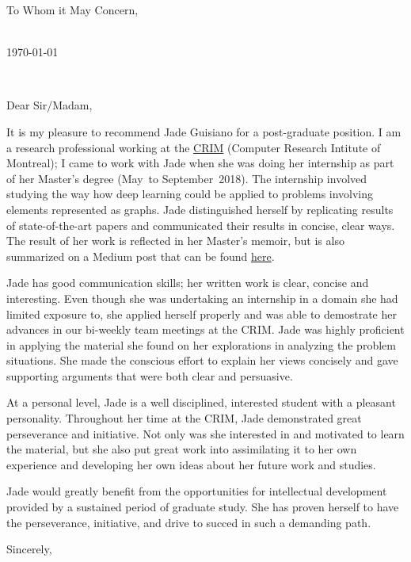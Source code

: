 \documentclass[11pt,a4paper]{letter} %
\def\opening#1{\thispagestyle{empty}
{\centering\fromaddress \vspace{0.6in} \\ %
\hspace*{\longindentation}\today\hspace*{\fill}\par} %
{\raggedright \toname \\ \toaddress \par} %
\vspace{0.4in} %
\noindent #1 %
}
\begin{document}

\begin{letter}
{To Whom it May Concern,
}


\opening{Dear Sir/Madam,}

It is my pleasure to recommend Jade Guisiano for a post-graduate position. I am a research professional working at the \href{http://crim.ca}{CRIM} (Computer Research Intitute of Montreal); I came to work with Jade when she was doing her internship as part of her Master's degree (May~to September~2018). The internship involved studying the way how deep learning could be applied to problems involving elements represented as graphs. Jade distinguished herself by replicating results of state-of-the-art papers and communicated their results in concise, clear ways. The result of her work is reflected in her Master's memoir, but is also summarized on a Medium post that can be found \href{https://medium.com/@jade.guisiano}{here}.


Jade has good communication skills; her written work is clear, concise and interesting. Even though she was undertaking an internship in a domain she had limited exposure to, she applied herself properly and was able to demostrate her advances in our bi-weekly team meetings at the CRIM. Jade was highly proficient in applying the material she found on her explorations in analyzing the problem
situations. She made the conscious effort to explain her views concisely and gave supporting arguments that were both
clear and persuasive. 


At a personal level, Jade is a well disciplined, interested student with a pleasant personality. Throughout her time at the CRIM, Jade demonstrated great
perseverance and initiative. Not only was she interested in and motivated to learn the material, but she also
put great work into assimilating it to her own experience and developing her own ideas about her future work and studies.

Jade would greatly benefit from the opportunities for intellectual development provided by
a sustained period of graduate study. She has proven herself to have the perseverance, initiative, and drive to succed in such a demanding path.


\closing{Sincerely,}


\end{letter}
\end{document}
